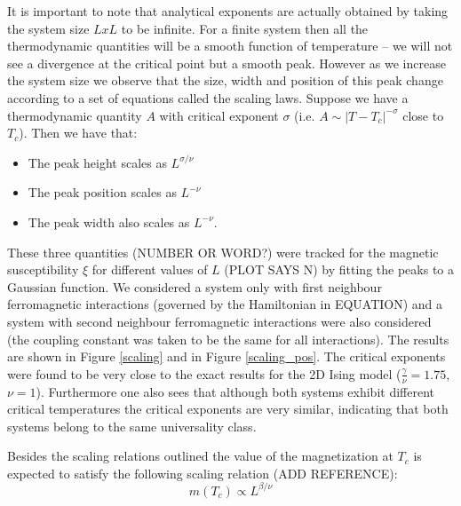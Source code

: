 \documentclass[twoside]{article}
\begin{document}
\begin{multicols}{2}
It is important to note that analytical exponents are actually obtained by taking the system size $LxL$ to be infinite. For a finite system then all the thermodynamic quantities will be a smooth function of temperature -- we will not see a divergence at the critical point but a smooth peak. However as we increase the system size we observe that the size, width and position of this peak change according to a set of equations called the scaling laws. Suppose we have a thermodynamic quantity $A$ with critical exponent $\sigma$ (i.e. $A \sim |T-T_c|^{-\sigma}$ close to $T_c$). Then we have that:

\begin{itemize}
\item The peak height scales as $L^{\sigma/\nu}$
\item The peak position scales as $L^{-\nu}$
\item The peak width also scales as $L^{-\nu}$.
\end{itemize}

These three quantities (NUMBER OR WORD?) were tracked for the magnetic susceptibility $\xi$ for different values of $L$ (PLOT SAYS N) by fitting the peaks to a Gaussian function. We considered a system only with first neighbour ferromagnetic interactions (governed by the Hamiltonian in EQUATION) and a system with second neighbour ferromagnetic interactions were also considered (the coupling constant was taken to be the same for all interactions). The results are shown in Figure \ref{scaling} and in Figure \ref{scaling_pos}. The critical exponents were found to be very close to the exact results for the 2D Ising model ($\frac{\gamma}{\nu} = 1.75$, $\nu = 1$). Furthermore one also sees that although both systems exhibit different critical temperatures the critical exponents are very similar, indicating that both systems belong to the same universality class.

Besides the scaling relations outlined the value of the magnetization at $T_c$ is expected to satisfy the following scaling relation (ADD REFERENCE):
\begin{equation}
m(T_c) \propto L^{\beta/\nu}
\end{equation}


\end{multicols}
\end{document}
